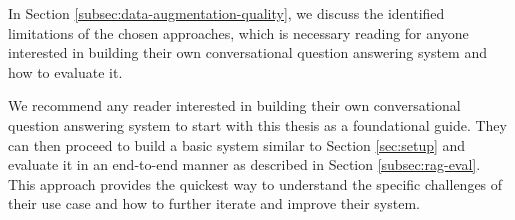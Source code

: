 In Section \ref{subsec:data-augmentation-quality}, we discuss the identified limitations of the chosen approaches, which is necessary reading for anyone interested in building their own conversational question answering system and how to evaluate it.

\vspace{\baselineskip}
\noindent We recommend any reader interested in building their own conversational question answering system to start with this thesis as a foundational guide. They can then proceed to build a basic system similar to Section \ref{sec:setup} and evaluate it in an end-to-end manner as described in Section \ref{subsec:rag-eval}. This approach provides the quickest way to understand the specific challenges of their use case and how to further iterate and improve their system.

